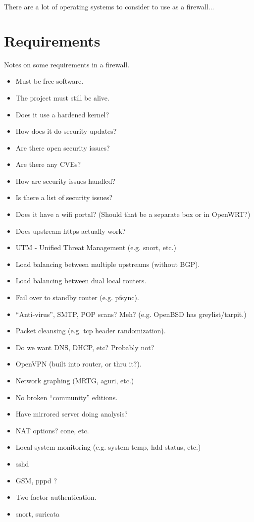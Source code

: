 %
%
%
%
%
There are a lot of operating systems to consider to use as a firewall...

\section{Requirements}

Notes on some requirements in a firewall.

\begin{itemize}
 \item Must be free software.
 \item The project must still be alive.
 \item Does it use a hardened kernel?
 \item How does it do security updates?
 \item Are there open security issues?
 \item Are there any CVEs?
 \item How are security issues handled?
 \item Is there a list of security issues?
 \item Does it have a wifi portal? (Should that be a separate box or in OpenWRT?)
 \item Does upstream https actually work?
 \item UTM - Unified Threat Management (e.g. snort, etc.)
 \item Load balancing between multiple upstreams (without BGP).
 \item Load balancing between dual local routers.
 \item Fail over to standby router (e.g. pfsync).
 \item ``Anti-virus'', SMTP, POP scans? Meh? (e.g. OpenBSD has greylist/tarpit.)
 \item Packet cleansing (e.g. tcp header randomization).
 \item Do we want DNS, DHCP, etc? Probably not?
 \item OpenVPN (built into router, or thru it?).
 \item Network graphing (MRTG, aguri, etc.)
 \item No broken ``community'' editions.
 \item Have mirrored server doing analysis?
 \item NAT options? cone, etc.
 \item Local system monitoring (e.g. system temp, hdd status, etc.)
 \item sshd
 \item GSM, pppd ?
 \item Two-factor authentication.
 \item snort, suricata
\end{itemize}


